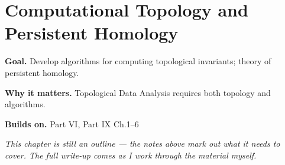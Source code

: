 \chapter{Computational Topology and Persistent Homology}
\label{ch:09-topology-10}

\begin{chapterintro}
\textbf{Goal.} Develop algorithms for computing topological invariants; theory of persistent homology.

\textbf{Why it matters.} Topological Data Analysis requires both topology and algorithms.

\textbf{Builds on.} Part VI, Part IX Ch.1–6
\end{chapterintro}

\textit{This chapter is still an outline --- the notes above mark out what it needs to cover. The full write-up comes as I work through the material myself.}
